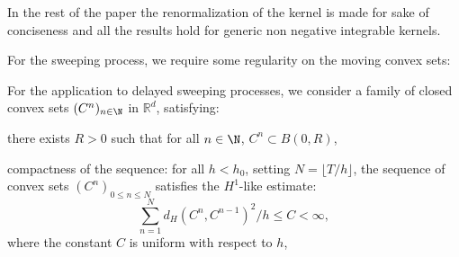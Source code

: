 \documentclass[]{jnsao}
\newcommand{\kernel}{\varrho}
\newcommand{\tkernel}{\tilde{\varrho}}
\begin{document}
In the rest of the paper the renormalization of the kernel is made for 
sake of conciseness and all the results hold for generic non negative
integrable kernels.
\renewcommand{\tkernel}{\kernel}


\noindent For the sweeping process, we require some regularity on the 
moving convex sets:
\begin{hypo}\label{hypo.convex.main}
For the application to delayed sweeping processes, we consider a family of 
closed convex sets $(C^n)_{n\in\N}$ in $\mathbb{R}^d$, satisfying:
\begin{compactenum}[i)]
	\item  there exists $R>0$ such that for all $n\in\N$, $C^n \subset B(0,R)$,
	\item compactness of the sequence: for all $h<h_0$, 
	setting $N=\lfloor T/h \rfloor$, the sequence of convex sets $(C^n)_{0\leq n \leq N}$ satisfies the $H^1$-like estimate:
	\begin{equation}\label{eq.bv.c.main}
\sum_{n=1}^N d_H(C^{n},C^{n-1})^2/h \leq C < \infty,
\end{equation}
where the constant $C$ is uniform with respect to $h$,
\end{compactenum}
\end{hypo}

\end{document}

